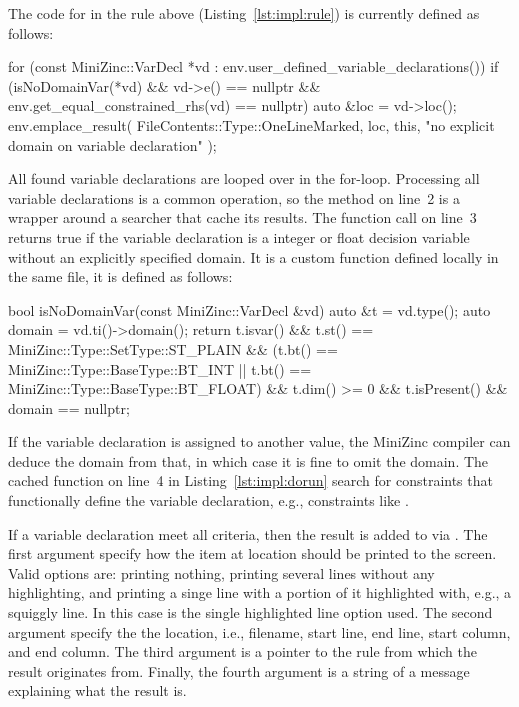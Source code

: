 \documentclass[a4paper,12pt]{article}
\begin{document}
The code for  in the rule above (Listing~\ref{lst:impl:rule}) is currently defined as follows:
\begin{cppp}[label=lst:impl:dorun,caption={\null}]
for (const MiniZinc::VarDecl *vd
     : env.user_defined_variable_declarations()) {
  if (isNoDomainVar(*vd) && vd->e() == nullptr &&
      env.get_equal_constrained_rhs(vd) == nullptr)
  {
    auto &loc = vd->loc();
    env.emplace_result(
      FileContents::Type::OneLineMarked, loc, this,
      "no explicit domain on variable declaration"
    );
  }
}
\end{cppp}
All found variable declarations are looped over in the for-loop. Processing all variable
declarations is a common operation, so the method on line~2 is a wrapper around a searcher
that cache its results. The function call on line~3 returns true if the variable declaration is
a integer or float decision variable without an explicitly specified domain. It is a custom function
defined locally in the same file, it is defined as follows:
\begin{cppp}[style=nonumbers]
bool isNoDomainVar(const MiniZinc::VarDecl &vd) {
  auto &t = vd.type();
  auto domain = vd.ti()->domain();
  return t.isvar()
    && t.st() == MiniZinc::Type::SetType::ST_PLAIN
    && (t.bt() == MiniZinc::Type::BaseType::BT_INT ||
        t.bt() == MiniZinc::Type::BaseType::BT_FLOAT)
    && t.dim() >= 0
    && t.isPresent()
    && domain == nullptr;
}
\end{cppp}

If the variable declaration is assigned to another value, the MiniZinc compiler can deduce
the domain from that, in which case it is fine to omit the domain. The cached function on
line~4 in Listing~\ref{lst:impl:dorun} search for constraints that functionally define the
variable declaration, e.g., constraints like .

\begin{sloppypar}
If a variable declaration meet all criteria, then the result is added to  via
. The first argument specify how the item at location  should be
printed to the screen. Valid options are: printing nothing, printing several lines without
any highlighting, and printing a singe line with a portion of it highlighted with, e.g., a
squiggly line. In this case is the single highlighted line option used. The second
argument specify the the location, i.e., filename, start line, end line, start column, and end
column. The third argument is a pointer to the rule from which the result originates from.
Finally, the fourth argument is a string of a message explaining what the result is.
\end{sloppypar}
\end{document}

